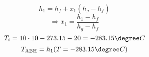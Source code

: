

\item[c)] 
    \[
    h_1 = h_f + x_1 (h_g - h_f)
    \]
    \[
    \Rightarrow x_1 = \frac{h_1 - h_f}{h_g - h_f}
    \]
    \[
    T_i = 10 \cdot 10 - 273.15 - 20 = -283.15 \degree C
    \]
    \[
    T_{\text{ABH}} = h_1 (T = -283.15 \degree C)
    \]